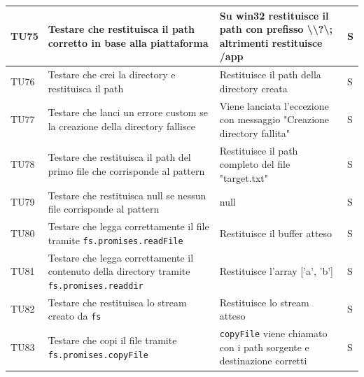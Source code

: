 \documentclass[a4paper,12pt]{article}
\begin{document}
\begin{longtable}{|M{1.2cm}|M{5cm}|M{8cm}|M{1.5cm}|}
            TU75 & Testare che \texttt{} restituisca il path corretto in base alla piattaforma & Su win32 restituisce il path con prefisso \textbackslash\textbackslash?\textbackslash; altrimenti restituisce /app & S \\
            \hline

            TU76 & Testare che \texttt{} crei la directory e restituisca il path & Restituisce il path della directory creata & S \\
            \hline

            TU77 & Testare che \texttt{} lanci un errore custom se la creazione della directory fallisce & Viene lanciata l'eccezione con messaggio "Creazione directory fallita" & S \\
            \hline

            TU78 & Testare che \texttt{} restituisca il path del primo file che corrisponde al pattern & Restituisce il path completo del file "target.txt" & S \\
            \hline

            TU79 & Testare che \texttt{} restituisca null se nessun file corrisponde al pattern & null & S \\
            \hline

            TU80 & Testare che \texttt{} legga correttamente il file tramite \texttt{fs.promises.readFile} & Restituisce il buffer atteso & S \\
            \hline

            TU81 & Testare che \texttt{} legga correttamente il contenuto della directory tramite \texttt{fs.promises.readdir} & Restituisce l'array ['a', 'b'] & S \\
            \hline

            TU82 & Testare che \texttt{} restituisca lo stream creato da \texttt{fs} & Restituisce lo stream atteso & S \\
            \hline

            TU83 & Testare che \texttt{} copi il file tramite \texttt{fs.promises.copyFile} & \texttt{copyFile} viene chiamato con i path sorgente e destinazione corretti & S \\
            \hline


\end{longtable}
\end{document}
